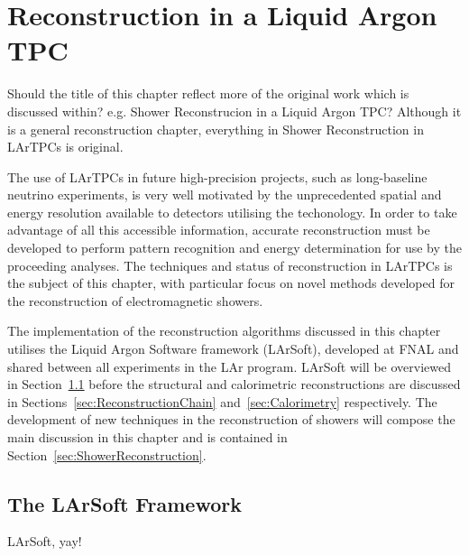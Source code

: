 
\chapter{Reconstruction in a Liquid Argon TPC}\label{chap:LArTPCReconstruction}

{\color{red} Should the title of this chapter reflect more of the original work which is discussed within?  e.g. Shower Reconstrucion in a Liquid Argon TPC?  Although  it is a general reconstruction chapter, everything in Shower Reconstruction in LArTPCs is original.}

The use of LArTPCs in future high-precision projects, such as long-baseline neutrino experiments, is very well motivated by the unprecedented spatial and energy resolution available to detectors utilising the techonology.  In order to take advantage of all this accessible information, accurate reconstruction must be developed to perform pattern recognition and energy determination for use by the proceeding analyses.  The techniques and status of reconstruction in LArTPCs is the subject of this chapter, with particular focus on novel methods developed for the reconstruction of electromagnetic showers.

The implementation of the reconstruction algorithms discussed in this chapter utilises the Liquid Argon Software framework (LArSoft), developed at FNAL and shared between all experiments in the LAr program.  LArSoft will be overviewed in Section~\ref{sec:LArSoft} before the structural and calorimetric reconstructions are discussed in Sections~\ref{sec:ReconstructionChain} and~\ref{sec:Calorimetry} respectively.  The development of new techniques in the reconstruction of showers will compose the main discussion in this chapter and is contained in Section~\ref{sec:ShowerReconstruction}.

\section{The LArSoft Framework}\label{sec:LArSoft}

LArSoft, yay!

